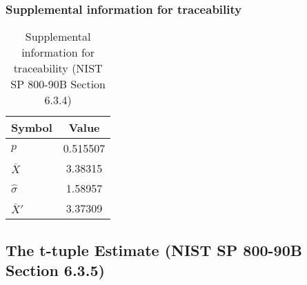 \documentclass[a3paper,xelatex,english]{bxjsarticle}
\begin{document}
\subsubsection{Supplemental information for traceability}
\renewcommand{\arraystretch}{1.8}
\begin{table}[h]
\caption{Supplemental information for traceability (NIST SP 800-90B Section 6.3.4)}
\begin{center}
\begin{tabular}{|l|c|}
\hline 
\rowcolor{anotherlightblue} %
Symbol				& Value \\ \hline 
$p$				& 0.515507\\ \hline 
$\bar{X}$ 		&  3.38315\\ \hline
$\hat{\sigma}$		&  1.58957\\ \hline
$\bar{X}'$ 		&  3.37309\\ \hline
\end{tabular}
\end{center}
\end{table}
\renewcommand{\arraystretch}{1.4}
\clearpage
\subsection{The t-tuple Estimate (NIST SP 800-90B Section 6.3.5)}\label{sec:Binary635}
\end{document}
